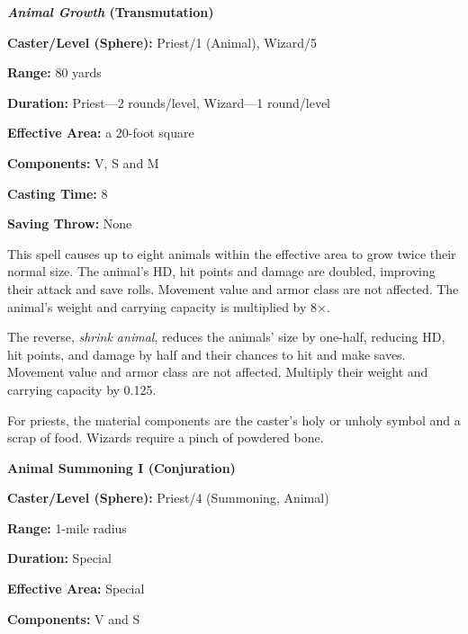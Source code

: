 \begin{multicols}{2}
\vspace{1em}

\noindent
\begin{minipage}{\columnwidth}

\noindent \textbf{\textit{Animal Growth} (Transmutation)}

\noindent \textbf{Caster/Level (Sphere):} Priest/1 (Animal), Wizard/5

\noindent \textbf{Range:} 80 yards

\noindent \textbf{Duration:} Priest---2 rounds/level, Wizard---1 round/level

\noindent \textbf{Effective Area:} a 20-foot square

\noindent \textbf{Components:} V, S and M

\noindent \textbf{Casting Time:} 8

\noindent \textbf{Saving Throw:} None

\end{minipage}

This spell causes up to eight animals within the effective area to grow twice their normal size.  The animal's HD, hit points and damage are doubled, improving their attack and save rolls.  Movement value and armor class are not affected.  The animal's weight and carrying capacity is multiplied by 8$\times$.

The reverse, \textit{shrink animal}, reduces the animals' size by one-half, reducing HD, hit points, and damage by half and their chances to hit and make saves.  Movement value and armor class are not affected.  Multiply their weight and carrying capacity by 0.125.

For priests, the material components are the caster's holy or unholy symbol and a scrap of food.  Wizards require a pinch of powdered bone.

\vspace{1em}

\noindent
\begin{minipage}{\columnwidth}

\noindent \textbf{Animal Summoning I (Conjuration)}

\noindent \textbf{Caster/Level (Sphere):} Priest/4 (Summoning, Animal)

\noindent \textbf{Range:} 1-mile radius

\noindent \textbf{Duration:} Special

\noindent \textbf{Effective Area:} Special

\noindent \textbf{Components:} V and S


\end{minipage}
\end{multicols}
